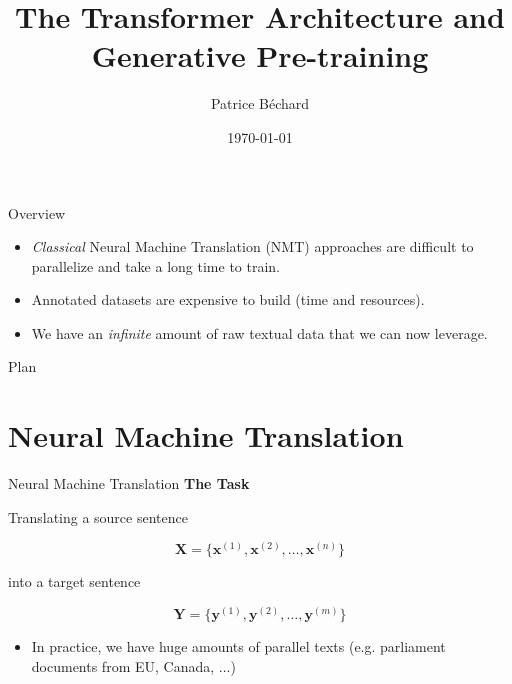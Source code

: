 \documentclass[aspectratio=169]{beamer}
\author{Patrice B\'echard}
\institute[Intact]{
\small{Intact Data Lab} \\
\textit{patrice.bechard@intact.net}
}
\title{The Transformer Architecture and Generative Pre-training}
\date{\today}
\begin{document}

\begin{frame}[plain, t]
  \titlepage
\end{frame}


\begin{frame}{Overview}

\vspace{.5cm}

\begin{itemize}
	\item \textit{Classical} Neural Machine Translation (NMT) approaches are difficult to parallelize and take a long time to train.
	\item Annotated datasets are expensive to build (time and resources).
	\item We have an \textit{infinite} amount of raw textual data that we can now leverage.
\end{itemize}

\end{frame}


\begin{frame}{Plan}
  \tableofcontents
\end{frame}

\section{Neural Machine Translation}

\begin{frame}{Neural Machine Translation}
\centering
\textbf{The Task}
\vspace{1cm}

\raggedright
Translating a source sentence 

$$
\mathbf{X} = \{ \mathbf{x}^{(1)}, \mathbf{x}^{(2)}, \dots, \mathbf{x}^{(n)}\}
$$

into a target sentence 

$$
\mathbf{Y} = \{ \mathbf{y}^{(1)}, \mathbf{y}^{(2)}, \dots, \mathbf{y}^{(m)} \}
$$

\begin{itemize}
	\item In practice, we have huge amounts of parallel texts (e.g. parliament documents from EU, Canada, ...)
\end{itemize}

\end{frame}
\end{document}

